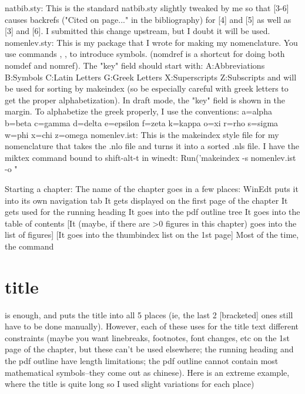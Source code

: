 natbib.sty:
    This is the standard natbib.sty slightly tweaked by me so that [3-6] causes backrefs ("Cited on page..." in the bibliography) for [4] and [5] as well as [3] and [6]. I submitted this change upstream, but I doubt it will be used.
nomenlev.sty:
    This is my package that I wrote for making my nomenclature. You use commands , ,  to introduce symbols. (nomdref is a shortcut for doing both nomdef and nomref). The "key" field should start with:
        A:Abbreviations
        B:Symbols
        C:Latin Letters
        G:Greek Letters
        X:Superscripts
        Z:Subscripts
    and will be used for sorting by makeindex (so be especially careful with greek letters to get the proper alphabetization). In draft mode, the "key" field is shown in the margin.
    To alphabetize the greek properly, I use the conventions:
        a=alpha
        b=beta
        c=gamma
        d=delta
        e=epsilon
        f=zeta
        k=kappa
        o=xi
        r=rho
        s=sigma
        w=phi
        x=chi
        z=omega
nomenlev.ist:
    This is the makeindex style file for my nomenclature that takes the .nlo file and turns it into a sorted .nls file.
    I have the miktex command bound to shift-alt-t in winedt:
    Run('makeindex -s nomenlev.ist -o "%

Starting a chapter:
The name of the chapter goes in a few places:
    WinEdt puts it into its own navigation tab
    It gets displayed on the first page of the chapter
    It gets used for the running heading
    It goes into the pdf outline tree
    It goes into the table of contents
    [It (maybe, if there are >0 figures in this chapter) goes into the list of figures]
    [It goes into the thumbindex list on the 1st page]
Most of the time, the command \chapter{title} is enough, and puts the title into all 5 places (ie, the last 2 [bracketed] ones still have to be done manually). However, each of these uses for the title text different constraints (maybe you want linebreaks, footnotes, font changes, etc on the 1st page of the chapter, but these can't be used elsewhere; the running heading and the pdf outline have length limitations; the pdf outline cannot contain most mathematical symbols--they come out as chinese). Here is an extreme example, where the title is quite long so I used slight variations for each place)
